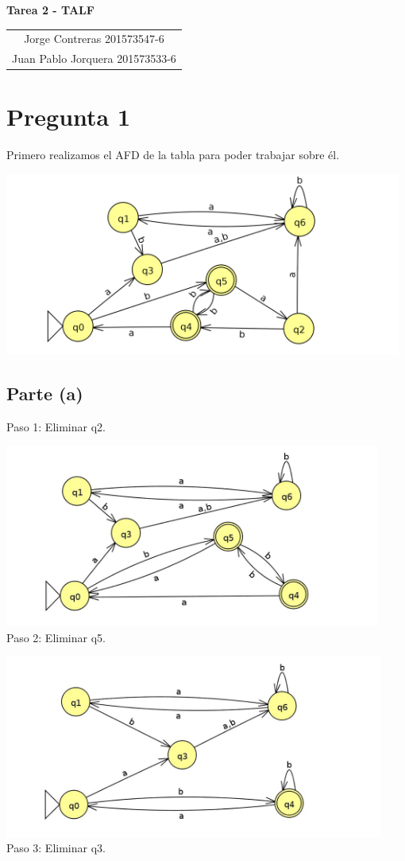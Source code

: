 \documentclass[11pt,letterpaper]{article}
\newcommand{\titulo}{Tarea 2 - TALF}
\newcommand{\integrantes}{\begin{tabular}{c}
Jorge Contreras 201573547-6 \\
Juan Pablo Jorquera  201573533-6 \\
\end{tabular}}
\renewcommand{\maketitle}
{
\thispagestyle{fancy}
\begin{center}
\begin{Large}
\textbf{\titulo}\\
\end{Large}
\vspace{0.5cm}
\integrantes
\end{center}
\vspace{0.3cm}
}
\begin{document}
\maketitle

\section{Pregunta 1}
Primero realizamos el AFD de la tabla para poder trabajar sobre él.

\includegraphics[height=6cm]{tarea_1.png}
\subsection{Parte (a)}
Paso 1: Eliminar q2.

\includegraphics[height=6cm]{tarea_1-a.png}
\\ Paso 2: Eliminar q5.

\includegraphics[height=6cm]{tarea_1-a-2.png}
\\ Paso 3: Eliminar q3.
\end{document}
